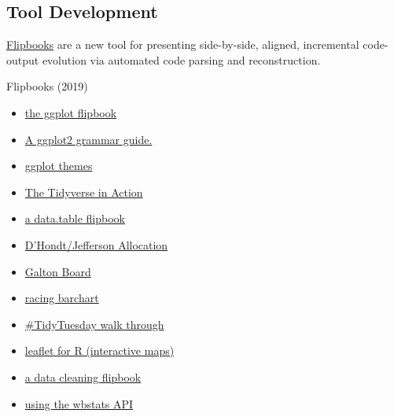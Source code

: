 \documentclass[margin, 10pt]{CVStyleTemplate}\usepackage[]{graphicx}\usepackage[]{color}
\begin{document}
\begin{resume}
\section{Tool Development}

\href{https://evamaerey.github.io/little_flipbooks_library/about/what_the_flipbook}{Flipbooks} are a new tool for presenting side-by-side, aligned, incremental code-output evolution via automated code parsing and reconstruction. 

Flipbooks (2019)

\begin{itemize}

\item \href{https://github.com/EvaMaeRey/ggplot_flipbook}{the ggplot flipbook}
\item \href{https://evamaerey.github.io/ggplot2_grammar_guide/ggplot2_grammar_guide}{A ggplot2 grammar guide.}
\item \href{https://evamaerey.github.io/little_flipbooks_library/taming_themes_in_ggplot/taming_ggplot_themes.html}{ggplot themes}
\item \href{https://github.com/EvaMaeRey/tidyverse_in_action}{The Tidyverse in Action}
\item \href{https://evamaerey.github.io/little_flipbooks_library/data.table/data.table}{a data.table flipbook}
\item \href{https://evamaerey.github.io/little_flipbooks_library/dhondt_jefferson_allocation/dhondt_jefferson_allocation}{D’Hondt/Jefferson Allocation}
\item \href{https://evamaerey.github.io/little_flipbooks_library/galton_board/galton_board.html#1}{Galton Board}
\item \href{https://evamaerey.github.io/little_flipbooks_library/racing_bars/racing_barcharts.html}{racing barchart}
\item \href{https://evamaerey.github.io/tidytuesday_walk_through/tidytuesday_highlights.html}{\#TidyTuesday walk through}
\item \href{https://evamaerey.github.io/little_flipbooks_library/leaflet/leaflet#1}{leaflet for R (interactive maps)}
\item \href{https://evamaerey.github.io/little_flipbooks_library/data_cleaning/data_cleaning#1}{a data cleaning flipbook}
\item \href{https://evamaerey.github.io/little_flipbooks_library/wbstats/wbstats#1}{using the wbstats API}


\end{itemize}


\end{resume}
\end{document}
